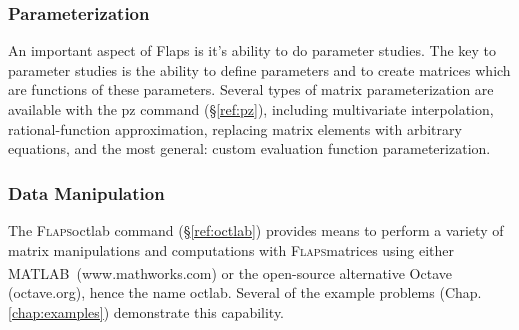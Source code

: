 \documentclass[11pt,openany,twoside]{book}
\numberwithin{equation}{section}		%
\newcommand{\Cmd}[1]{{\sf #1}}
\newcommand{\Flaps}{\textsc{Flaps\:}}
\newcommand{\Matlab}{{\footnotesize{MATLAB\textsuperscript{\textregistered}}\:}}
\newcommand{\Sectref}[1]{\S\ref{#1}}
\newcommand{\Chapref}[1]{Chap. \ref{#1}}
\begin{document}
\subsubsection{Parameterization}
An important aspect of Flaps is it's ability to do parameter
studies. The key to parameter studies is the ability to
define parameters and to create matrices which are functions of
these parameters. Several types of matrix parameterization are available
with the \Cmd{pz} command (\Sectref{ref:pz}),
including multivariate interpolation,
rational-function approximation, 
replacing matrix elements with arbitrary equations,
and the most general: custom evaluation function parameterization.
        
\subsubsection{Data Manipulation}
The \Flaps \Cmd{octlab} command (\Sectref{ref:octlab}) provides means
to perform a variety of matrix manipulations and computations with
\Flaps matrices using either \Matlab\ (www.mathworks.com)
\index{matlab@\Matlab}
or the open-source alternative Octave (octave.org), hence
the name \Cmd{octlab}.
Several of the example problems (\Chapref{chap:examples})
demonstrate this capability.
        
\end{document}
